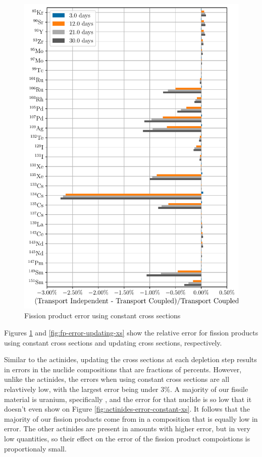     \begin{figure}[h!tpb]
        \centering
        \includegraphics[width=\linewidth]{figs/fission_products_constant_xs_predictor_fission_q_days.pdf}
        \caption{Fission product error using constant cross sections}
        \label{fig:fp-error-constant-xs}
    \end{figure}

    Figures \ref{fig:fp-error-constant-xs} and \ref{fig:fp-error-updating-xs}
    show the relative error for fission products using constant cross sections
    and updating cross sections, respectively.

    Similar to the actinides, updating the cross sections at each depletion step
    results in errors in the nuclide compositions  that are fractions of
    percents. However, unlike the actinides, the errors when using constant
    cross sections are all relavtively low, with the largest error being under
    3\%. A majority of our fissile material is uranium, specifically
    , and the error for that nuclide is so low that it doesn't even
    show on Figure \ref{fig:actinides-error-constant-xs}. It follows that the
    majority of our fission products come from  in a composition
    that is equally low in error. The other actinides are present in amounts
    with higher error, but in very low quantities, so their effect on the error
    of the fission product compoistions is proportionaly small.
    
